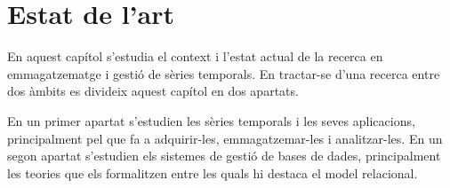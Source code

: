 \chapter{Estat de l'art}
\label{sec:art}

En aquest capítol s'estudia el context i l'estat actual de la recerca
en emmagatzematge i gestió de sèries temporals. En tractar-se d'una
recerca entre dos àmbits es divideix aquest capítol en dos apartats.

En un primer apartat s'estudien les sèries temporals i les seves
aplicacions, principalment pel que fa a adquirir-les, emmagatzemar-les
i analitzar-les.  En un segon apartat s'estudien els sistemes de
gestió de bases de dades, principalment les teories que els
formalitzen entre les quals hi destaca el model relacional.











